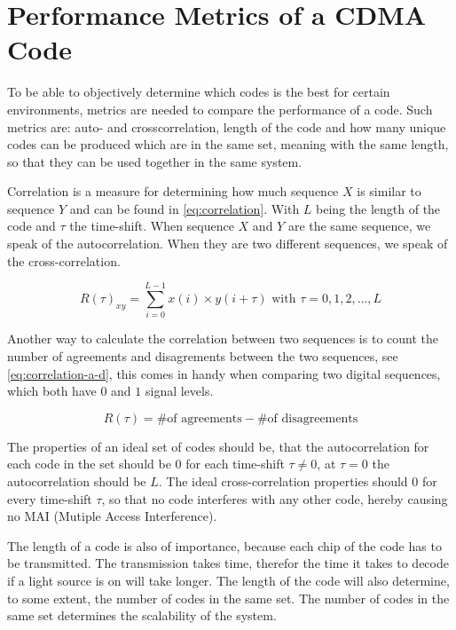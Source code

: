 
\section{Performance Metrics of a CDMA Code}
\label{sec:performance-metrics-cdma}

To be able to objectively determine which codes is the best for certain environments, metrics are needed to compare the performance of a code.
Such metrics are: auto- and crosscorrelation, length of the code and how many unique codes can be produced which are in the same set, meaning with the same length, so that they can be used together in the same system.



Correlation is a measure for determining how much sequence $X$ is similar to sequence $Y$ and can be found in \autoref{eq:correlation}.
With $L$ being the length of the code and $\tau$ the time-shift.
When sequence $X$ and $Y$ are the same sequence, we speak of the autocorrelation.
When they are two different sequences, we speak of the cross-correlation. 

\begin{equation}
	R(\tau)_{xy} = \displaystyle\sum_{i = 0} ^ {L - 1} x(i) \times y(i + \tau) {\text{  with $\tau = 0, 1, 2, \dotsc, L$}}
	\label{eq:correlation}
\end{equation}


Another way to calculate the correlation between two sequences is to count the number of agreements and disagrements between the two sequences, see \autoref{eq:correlation-a-d}, this comes in handy when comparing two digital sequences, which both have $0$ and $1$ signal levels.

\begin{equation}
	R(\tau) = \text{\# of agreements} - \text{\# of disagreements} 
	\label{eq:correlation-a-d}
\end{equation}




The properties of an ideal set of codes should be, that the autocorrelation for each code in the set should be $0$ for each time-shift $\tau \neq 0$, at $\tau = 0$ the autocorrelation should be $L$.
The ideal cross-correlation properties should $0$ for every time-shift $\tau$, so that no code interferes with any other code, hereby causing no MAI (Mutiple Access Interference).



The length of a code is also of importance, because each chip of the code has to be transmitted.
The transmission takes time, therefor the time it takes to decode if a light source is on will take longer.
The length of the code will also determine, to some extent, the number of codes in the same set.
The number of codes in the same set determines the scalability of the system.





